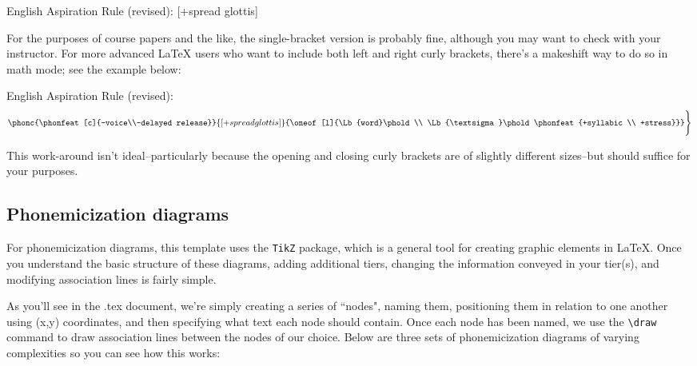 \documentclass{article}
\begin{document}
\ea \label{EngAspRuleRev}
English Aspiration Rule (revised): 
\phonc
{}
{[+spread glottis]}
{}
\z


\noindent For the purposes of course papers and the like, the single-bracket version is probably fine, although you may want to check with your instructor. For more advanced \LaTeX{} users who want to include both left and right curly brackets, there's a makeshift way to do so in math mode; see the example below:

\ea \label{EngAspRuleRev2}
English Aspiration Rule (revised): 
\[ %
\phonc
{\phonfeat[c]{-voice\\-delayed release}}
{[+spread glottis]}
{\oneof[l]{\Lb{word}\phold \\ 
\Lb{\textsigma}\phold \phonfeat{+syllabic \\ +stress}}}
\Bigg\}
\] %
\z

\noindent This work-around isn't ideal--particularly because the opening and closing curly brackets are of slightly different sizes--but should suffice for your purposes.

\subsection{Phonemicization diagrams}\label{SectPhonDia}
For phonemicization diagrams, this template uses the \texttt{TikZ} package, which is a general tool for creating graphic elements in \LaTeX{}. Once you understand the basic structure of these diagrams, adding additional tiers, changing the information conveyed in your tier(s), and modifying association lines is fairly simple. 

 As you'll see in the .tex document, we're simply creating a series of ``nodes", naming them, positioning them in relation to one another using (x,y) coordinates, and then specifying what text each node should contain. Once each node has been named, we use the \verb|\draw| command to draw association lines between the nodes of our choice. Below are three sets of phonemicization diagrams of varying complexities so you can see how this works:
\end{document}
